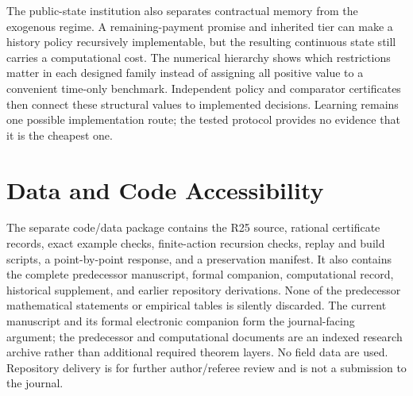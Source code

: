 \documentclass[11pt,letterpaper]{article}
\theoremstyle{definition}\newtheorem{assumption}[theorem]{Assumption}
\begin{document}
The public-state institution also separates contractual memory from the exogenous regime. A remaining-payment promise and inherited tier can make a history policy recursively implementable, but the resulting continuous state still carries a computational cost. The numerical hierarchy shows which restrictions matter in each designed family instead of assigning all positive value to a convenient time-only benchmark. Independent policy and comparator certificates then connect these structural values to implemented decisions. Learning remains one possible implementation route; the tested protocol provides no evidence that it is the cheapest one.

\section*{Data and Code Accessibility}
The separate code/data package contains the R25 source, rational certificate records, exact example checks, finite-action recursion checks, replay and build scripts, a point-by-point response, and a preservation manifest. It also contains the complete predecessor manuscript, formal companion, computational record, historical supplement, and earlier repository derivations. None of the predecessor mathematical statements or empirical tables is silently discarded. The current manuscript and its formal electronic companion form the journal-facing argument; the predecessor and computational documents are an indexed research archive rather than additional required theorem layers. No field data are used. Repository delivery is for further author/referee review and is not a submission to the journal.


\end{document}
